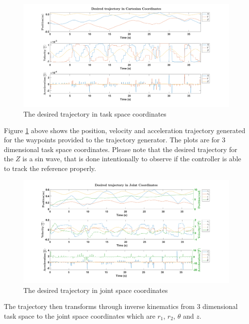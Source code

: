 \documentclass{UoNMCHA}
\numberwithin{equation}{section}
\begin{document}
	\begin{figure}[H]
		\begin{center}
			\includegraphics[width=.9\linewidth]{figs/Picture25}
			\caption{The desired trajectory in task space coordinates}
			\label{figs/Picture25}
		\end{center}
	\end{figure}
	
	Figure \ref{figs/Picture25} above shows the position, velocity and acceleration trajectory generated for the waypoints provided to the trajectory generator. The plots are for 3 dimensional task space coordinates. Please note that the desired trajectory for the $ Z $ is a sin wave, that is done intentionally to observe if the controller is able to track the reference properly.
	
	\begin{figure}[H]
		\begin{center}
			\includegraphics[width=.9\linewidth]{figs/Picture26}
			\caption{The desired trajectory in joint space coordinates}
			\label{figs/Picture26}
		\end{center}
	\end{figure}

	The trajectory then transforms through inverse kinematics from 3 dimensional task space to the joint space coordinates which are $ r_1 $, $ r_2 $, $ \theta $ and $ z $.
\newpage
\end{document}
